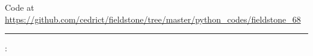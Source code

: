 

\begin{center}
Code at \url{https://github.com/cedrict/fieldstone/tree/master/python_codes/fieldstone_68}
\end{center}

\par\noindent\rule{\textwidth}{0.4pt}




\Literature: \cite{vack08}\cite{syva10}\cite{vakn12}
